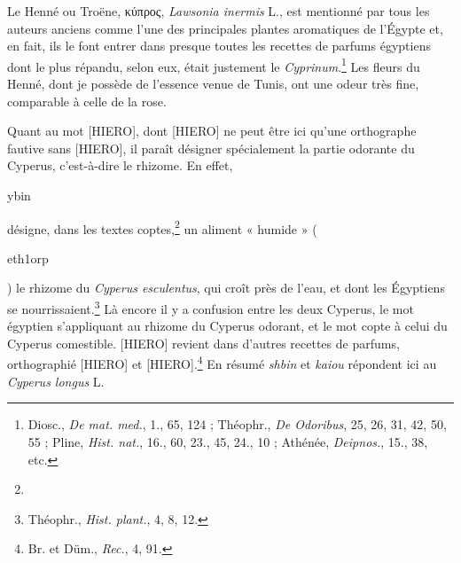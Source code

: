 \documentclass[a4paper, 11pt, oneside]{article}
\begin{document}
Le Henné ou Troëne, κύπρος, \emph{Lawsonia inermis} L., est mentionné par tous les auteurs anciens comme l'une des principales plantes aromatiques de l'Égypte et, en fait, ils le font entrer dans presque toutes les recettes de parfums égyptiens dont le plus répandu, selon eux, était justement le \emph{Cyprinum}.\footnote{Diosc., \emph{De mat. med.}, 1., 65, 124 ; Théophr., \emph{De Odoribus}, 25, 26, 31, 42, 50, 55 ; Pline, \emph{Hist. nat.}, 16., 60, 23., 45, 24., 10 ; Athénée, \emph{Deipnos.}, 15., 38, etc.} Les fleurs du Henné, dont je possède de l'essence venue de Tunis, ont une odeur très fine, comparable à celle de la rose.


Quant au mot [HIERO], dont [HIERO] ne peut être ici qu'une orthographe fautive sans [HIERO], il paraît désigner spécialement la partie odorante du Cyperus, c'est-à-dire le rhizome. En effet, \begin{coptic}ybin\end{coptic} désigne, dans les textes coptes,\footnote{} un aliment « humide » (\begin{coptic}eth1orp\end{coptic}) le rhizome du \emph{Cyperus esculentus}, qui croît près de l'eau, et dont les Égyptiens se nourrissaient.\footnote{Théophr., \emph{Hist. plant.}, 4, 8, 12.} Là encore il y a confusion entre les deux Cyperus, le mot égyptien s'appliquant au rhizome du Cyperus odorant, et le mot copte à celui du Cyperus comestible. [HIERO] revient dans d'autres recettes de parfums, orthographié [HIERO] et [HIERO].\footnote{Br. et Düm., \emph{Rec.}, 4, 91.} En résumé \emph{shbin} et \emph{kaiou} répondent ici au \emph{Cyperus longus} L.
\end{document}
